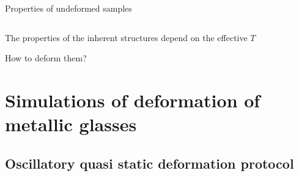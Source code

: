 \documentclass[compress]{beamer}
\begin{document}
\begin{frame}{Properties of undeformed samples}
\begin{block}{}
\begin{columns}[T]
			\end{columns}
			
		\end{block}
		
		\vspace{0.5cm}
		
		The properties of the inherent structures depend on the effective $T$
		
		\vspace{0.3cm}
		
		 How to deform them?
		
	\end{frame}

	\section{Simulations of deformation of metallic glasses}
	
	\subsection{Oscillatory quasi static deformation protocol}
\end{document}
